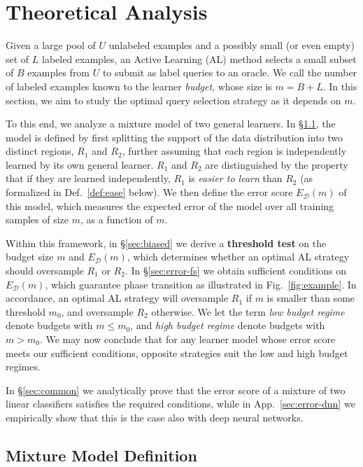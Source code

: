 \documentclass{article}
\newcommand{\Dd}{\mathcal{D}}
\newcommand{\pR}{1}\newcommand{\rR}{2}\newcommand{\prR}{i}
\newcommand{\app}{App.}
\begin{document}
\section{Theoretical Analysis}\label{sec:theoretical_analysis}

Given a large pool of $U$ unlabeled examples and a possibly small (or even empty) set of $L$ labeled examples, an Active Learning (AL) method selects a small subset of $B$ examples from $U$ to submit as label queries to an oracle. We call the number of labeled examples known to the learner \emph{budget}, whose size is $m=B+L$. In this section, we aim to study the optimal query selection strategy as it depends on $m$.

To this end, we analyze a mixture model of two general learners. In \S\ref{sec:model}, the model is defined by first splitting the support of the data distribution into two distinct regions, $R_1$ and $R_2$, further assuming that each region is independently learned by its own general learner. $R_1$ and $R_2$ are distinguished by the property that if they are learned independently, $R_\pR$ is \emph{easier to learn} than $R_\rR$ (as formalized in Def.~\ref{def:ease} below). We then define the error score $E_\Dd(m)$ of this model, which measures the expected error of the model over all training samples of size $m$, as a function of $m$. 

Within this framework, in \S\ref{sec:biased} we derive a \textbf{threshold test} on the budget size $m$ and $E_\Dd(m)$, which determines whether an optimal AL strategy should oversample $R_1$  or $R_2$. In \S\ref{sec:error-fs} we obtain sufficient conditions on $E_\Dd(m)$, which guarantee phase transition as illustrated in Fig.~\ref{fig:example}. In accordance, an optimal AL strategy will oversample $R_1$ if $m$ is smaller than some threshold $m_0$, and oversample $R_2$ otherwise. We let the term \emph{low budget regime} denote budgets with $m\leq m_0$, and \emph{high budget regime} denote budgets with $m>m_0$. We may now conclude that for any learner model whose error score meets our sufficient conditions, opposite strategies suit the low and high budget regimes. 

In \S\ref{sec:common} we analytically prove that the error score of a mixture of two linear classifiers satisfies the required conditions, while in \app~\ref{sec:error-dnn} we empirically show that this is the case also with deep neural networks. 


\subsection{Mixture Model Definition}
\label{sec:model}
\end{document}
